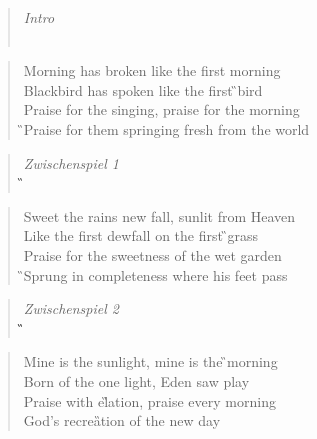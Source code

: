 \documentclass[8pt,a4paper,oneside, onecolumn]{article}
\begin{document}
\begin{multicols}{2}
\raggedcolumns
\begin{verse}
\textit{Intro}\\
\D{}\qquad \Dsus{}\quad\qquad \A{}\qquad \Fis{}\qquad \Hm{}\qquad \Gs{}\qquad \C{}\qquad \F{}\qquad \C{}\\
\end{verse}
\begin{verse}
Morning has \C{}bro\Dm{}ken \Gs{}like the first \F{}mor\C{}ning\\
Blackbird has \Em{}spo\Am{}ken like the first \G{}bird \Gs{}\\
\C{}Praise for the \F{}singing, \C{}praise for the \Am{}mor\D{}ning \\
\G{}Praise for them \C{}spring\F{}ing \Gs{}fresh from the \C{}world\\
\end{verse}

\begin{verse}
\textit{Zwischenspiel 1}\\
\F{}\qquad \G{}\qquad \E{}\qquad \Am{}\qquad \G{}\qquad \C{}\qquad \Gs{}\\
\end{verse}

\begin{verse}
Sweet the rains \C{}new \Dm{}fall, s\Gs{}unlit from \F{}Hea\C{}ven \\
Like the first \Em{}dew\Am{}fall on the first \G{}grass\Gs{} \\
\C{}Praise for the \F{}sweetness \C{}of the wet \Am{}gar\Dm{}den \\
\G{}Sprung in com\C{}plete\F{}ness \Gs{}where his feet \C{}pass\\
\end{verse}


\begin{verse}
\textit{Zwischenspiel 2}\\
\F{}\qquad \G{}\qquad \E{}\qquad \Am{}\qquad \G{}\qquad \Fis{}\qquad \Hm{}\qquad \G{}\qquad \D{}\qquad \A{}\qquad \D{}\\
\end{verse}

\begin{verse}
Mine is the \D{}sun\Em{}light, \As{}mine is the \G{}mor\D{}ning \\
Born of the \Fism{}one \Hm{}light, \Esus{}Eden saw play \\
\D{}Praise with el\G{}ation, \D{}praise every \Hm{}mor\E{}ning \\
\A{}God's re\D{}crea\G{}tion \As{}of the new day\\
\end{verse}


\end{multicols}
\end{document}

